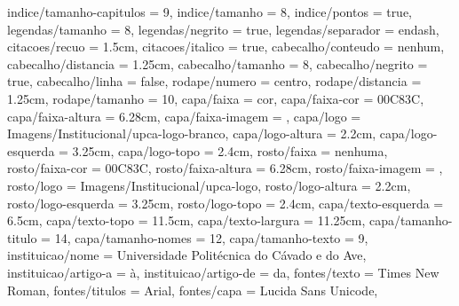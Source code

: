 {  indice/tamanho-capitulos  = 9,
  indice/tamanho            = 8,
  indice/pontos             = true,     %
  legendas/tamanho          = 8,
  legendas/negrito          = true,
  legendas/separador        = endash,   %
  citacoes/recuo            = 1.5cm,    %
  citacoes/italico          = true,
  cabecalho/conteudo        = nenhum,   %
  cabecalho/distancia       = 1.25cm,   %
  cabecalho/tamanho         = 8,
  cabecalho/negrito         = true,
  cabecalho/linha           = false,
  rodape/numero             = centro,   %
  rodape/distancia          = 1.25cm,   %
  rodape/tamanho            = 10,
  capa/faixa                = cor,      %
  capa/faixa-cor            = 00C83C,   %
  capa/faixa-altura         = 6.28cm,
  capa/faixa-imagem         = ,         %
  capa/logo                 = Imagens/Institucional/upca-logo-branco,
  capa/logo-altura          = 2.2cm,
  capa/logo-esquerda        = 3.25cm,
  capa/logo-topo            = 2.4cm,
  rosto/faixa               = nenhuma,
  rosto/faixa-cor           = 00C83C,
  rosto/faixa-altura        = 6.28cm,
  rosto/faixa-imagem        = ,
  rosto/logo                = Imagens/Institucional/upca-logo,
  rosto/logo-altura         = 2.2cm,
  rosto/logo-esquerda       = 3.25cm,
  rosto/logo-topo           = 2.4cm,
  capa/texto-esquerda       = 6.5cm,    %
  capa/texto-topo           = 11.5cm,   %
  capa/texto-largura        = 11.25cm,
  capa/tamanho-titulo       = 14,
  capa/tamanho-nomes        = 12,
  capa/tamanho-texto        = 9,
  instituicao/nome          = Universidade Politécnica do Cávado e do Ave,
  instituicao/artigo-a      = à,        %
  instituicao/artigo-de     = da,       %
  fontes/texto              = Times New Roman,
  fontes/titulos            = Arial,
  fontes/capa               = Lucida Sans Unicode,
}
